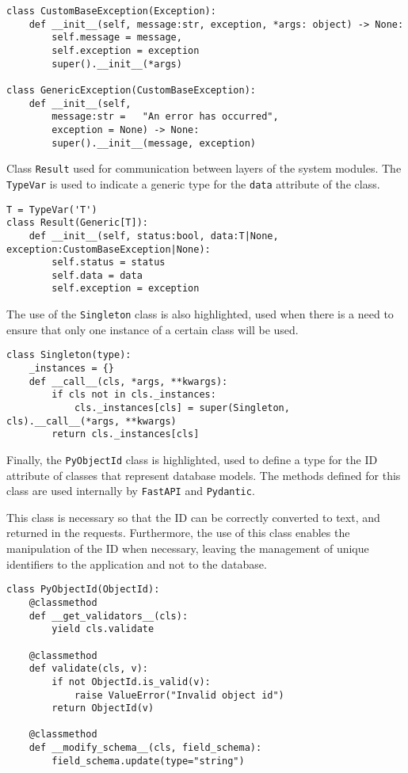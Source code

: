 \begin{Verbatim}[fontsize=\small, baselinestretch=0.6]
class CustomBaseException(Exception):
    def __init__(self, message:str, exception, *args: object) -> None:
        self.message = message,
        self.exception = exception
        super().__init__(*args)

class GenericException(CustomBaseException):
    def __init__(self,
        message:str =   "An error has occurred",
        exception = None) -> None:
        super().__init__(message, exception)
\end{Verbatim}


Class \texttt{Result} used for communication between layers of the system modules. The \texttt{TypeVar} is used to indicate a generic type for the \texttt{data} attribute of the class.

\begin{Verbatim}[fontsize=\small, baselinestretch=0.6]
T = TypeVar('T')
class Result(Generic[T]):
    def __init__(self, status:bool, data:T|None, exception:CustomBaseException|None):
        self.status = status
        self.data = data
        self.exception = exception
\end{Verbatim}

The use of the \texttt{Singleton} class is also highlighted, used when there is a need to ensure that only one instance of a certain class will be used.

\begin{Verbatim}[fontsize=\small, baselinestretch=0.6]
class Singleton(type):
    _instances = {}
    def __call__(cls, *args, **kwargs):
        if cls not in cls._instances:
            cls._instances[cls] = super(Singleton, cls).__call__(*args, **kwargs)
        return cls._instances[cls]
\end{Verbatim}

Finally, the \texttt{PyObjectId} class is highlighted, used to define a type for the ID attribute of classes that represent database models. The methods defined for this class are used internally by \texttt{FastAPI} and \texttt{Pydantic}.

This class is necessary so that the ID can be correctly converted to text, and returned in the requests. Furthermore, the use of this class enables the manipulation of the ID when necessary, leaving the management of unique identifiers to the application and not to the database.

\begin{Verbatim}[fontsize=\small, baselinestretch=0.6]
class PyObjectId(ObjectId):
    @classmethod
    def __get_validators__(cls):
        yield cls.validate

    @classmethod
    def validate(cls, v):
        if not ObjectId.is_valid(v):
            raise ValueError("Invalid object id")
        return ObjectId(v)

    @classmethod
    def __modify_schema__(cls, field_schema):
        field_schema.update(type="string")
\end{Verbatim}

